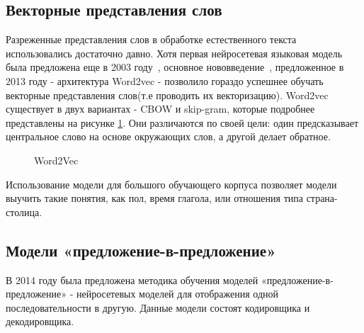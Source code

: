 \subsection{Векторные представления слов}
Разреженные представления слов в обработке естественного текста использовались достаточно давно. Хотя первая нейросетевая языковая модель была предложена еще в 2003 году~\cite{bengio_2003}, основное нововведение~\cite{mikolov_2013}, предложенное в 2013 году - архитектура Word2vec - позволило гораздо успешнее обучать векторные представления слов(т.е проводить их векторизацию). Word2vec существует в двух вариантах - CBOW и skip-gram, которые подробнее представлены на рисунке \ref{fig:Neuro2-Word2Vec}. Они различаются по своей цели: один предсказывает центральное слово на основе окружающих слов, а другой делает обратное.


\begin{figure}[ht]
  \caption{Word2Vec}\label{fig:Neuro2-Word2Vec}
\end{figure}

Использование модели для большого обучающего корпуса позволяет модели выучить такие понятия, как пол, время глагола, или отношения типа страна-столица. 

%
\subsection{Модели «предложение-в-предложение»}
В 2014 году была предложена методика обучения моделей «предложение-в-предложение» \cite{sutskever_2014} - нейросетевых моделей для отображения одной последовательности в другую. Данные модели состоят кодировщика и декодировщика. 

